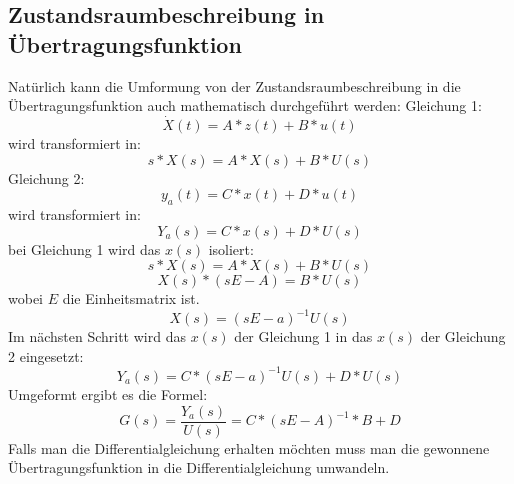 \subsection*{Zustandsraumbeschreibung in Übertragungsfunktion}
Natürlich kann die Umformung von der Zustandsraumbeschreibung in die Übertragungsfunktion auch mathematisch durchgeführt werden:
Gleichung 1:
\begin{equation}
	\dot{X}(t)=A*z(t)+B*u(t)
\end{equation}
wird transformiert in:
\begin{equation}
	s*X(s)=A*X(s)+B*U(s)
\end{equation}
Gleichung 2:
\begin{equation}
	y_{a}(t)=C*x(t)+D*u(t)
\end{equation}
wird transformiert in:
\begin{equation}
	Y_{a}(s)=C*x(s)+D*U(s)
\end{equation}
bei Gleichung 1 wird  das $x(s)$ isoliert:
\begin{equation}
	s*X(s)=A*X(s)+B*U(s)
\end{equation}
\begin{equation}
	X(s)*(sE-A)=B*U(s)
\end{equation}
wobei $E$ die Einheitsmatrix ist.
\begin{equation}
	X(s)=(sE-a)^{-1}U(s)
\end{equation}
Im nächsten Schritt wird das $x(s)$ der Gleichung 1 in das $x(s)$ der Gleichung 2 eingesetzt:
\begin{equation}
	Y_{a}(s)=C*(sE-a)^{-1}U(s)+D*U(s)
\end{equation}
Umgeformt ergibt es die Formel:
\begin{equation}
	G(s)=\frac{Y_{a}(s)}{U(s)}=C*(sE-A)^{-1}*B+D
\end{equation}
Falls man die Differentialgleichung erhalten möchten muss man die gewonnene Übertragungsfunktion in die Differentialgleichung umwandeln.
